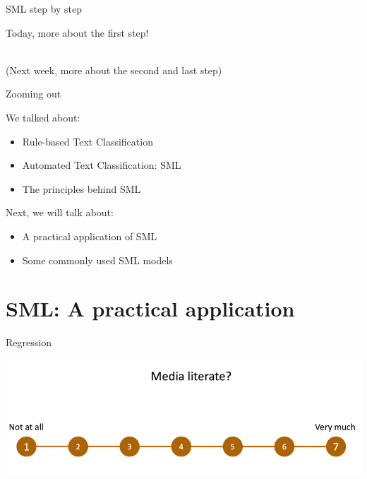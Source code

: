 \documentclass[compress]{beamer}
\begin{document}
\begin{frame}{SML step by step}
	
Today, more about the first step! \\\

(Next week, more about the second and last step)
\end{frame}


\begin{frame}[fragile]{Zooming out} 
	
\begin{alertblock}{We talked about:}
	\begin{itemize}
		\item Rule-based Text Classification
		\item Automated Text Classification: SML
		\item The principles behind SML
	\end{itemize}
\end{alertblock}
	
\begin{alertblock}{Next, we will talk about:}
	\begin{itemize}
		\item A practical application of SML
		\item Some commonly used SML models
	\end{itemize}
\end{alertblock}	
	
\end{frame}


\section{SML: A practical application}

\begin{frame}{Regression}
	
\begin{center}
	\includegraphics[width=\linewidth,height=\textheight,keepaspectratio]{../pictures/medialiteracyscale.png} \\\
\end{center}
	
\end{frame}
\end{document}
